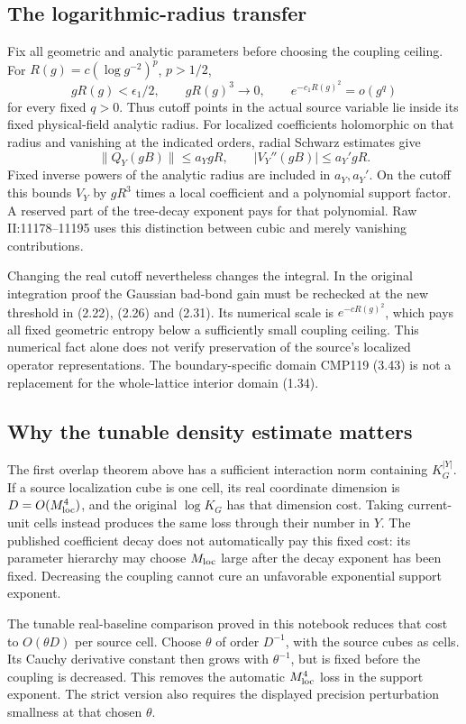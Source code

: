 \subsection{The logarithmic-radius transfer}

Fix all geometric and analytic parameters before choosing the
coupling ceiling. For $R(g)=c(\log g^{-2})^p$, $p>1/2$,
\[
 gR(g)<\epsilon_1/2,
 \qquad gR(g)^3\longrightarrow0,
 \qquad e^{-c_1R(g)^2}=o(g^q)
\]
for every fixed $q>0$. Thus cutoff points in the actual source
variable lie inside its fixed physical-field analytic radius.
For localized coefficients holomorphic on that radius and
vanishing at the indicated orders, radial Schwarz estimates give
\[
 \|Q_Y(gB)\|\le a_Y gR,
 \qquad |V_Y''(gB)|\le a_Y' gR.
\]
Fixed inverse powers of the analytic radius are included in
$a_Y,a_Y'$. On the cutoff this bounds $V_Y$ by $gR^3$ times
a local coefficient and a polynomial support factor. A reserved
part of the tree-decay exponent pays for that polynomial.
Raw II:11178--11195 uses this distinction between cubic and
merely vanishing contributions.

Changing the real cutoff nevertheless changes the integral.
In the original integration proof the Gaussian bad-bond gain
must be rechecked at the new threshold in (2.22), (2.26) and
(2.31). Its numerical scale is $e^{-cR(g)^2}$, which pays all
fixed geometric entropy below a sufficiently small coupling
ceiling. This numerical fact alone does not verify preservation
of the source's localized operator representations. The
boundary-specific domain CMP119 (3.43) is not a replacement
for the whole-lattice interior domain (1.34).

\subsection{Why the tunable density estimate matters}

The first overlap theorem above has a sufficient interaction norm
containing $K_G^{|Y|}$. If a source localization cube is one cell,
its real coordinate dimension is $D=O(M_{\rm loc}^4)$, and the
original $\log K_G$ has that dimension cost. Taking current-unit
cells instead produces the same loss through their number in
$Y$. The published coefficient decay does not automatically pay
this fixed cost: its parameter hierarchy may choose $M_{\rm loc}$
large after the decay exponent has been fixed. Decreasing the
coupling cannot cure an unfavorable exponential support exponent.

The tunable real-baseline comparison proved in this notebook
reduces that cost to $O(\theta D)$ per source cell. Choose
$\theta$ of order $D^{-1}$, with the source cubes as cells.
Its Cauchy derivative constant then grows with $\theta^{-1}$,
but is fixed before the coupling is decreased. This removes
the automatic $M_{\rm loc}^4$ loss in the support exponent.
The strict version also requires the displayed precision
perturbation smallness at that chosen $\theta$.

